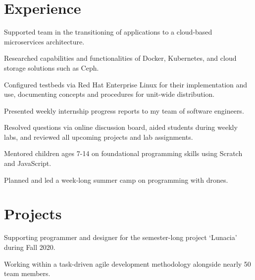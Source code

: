 \documentclass[]{deedy-resume-openfont}
\begin{document}
\section{Experience}


\begin{tightemize}
\item Supported team in the transitioning of applications to a cloud-based microservices architecture.
\item Researched capabilities and functionalities of Docker, Kubernetes, and cloud storage solutions such as Ceph.
\item Configured testbeds via Red Hat Enterprise Linux for their implementation and use, documenting concepts and procedures for unit-wide distribution.
\item Presented weekly internship progress reports to my team of software engineers.
\end{tightemize}
\sectionsep

\begin{tightemize}
\item Resolved questions via online discussion board, aided students during weekly labs, and reviewed all upcoming projects and lab assignments.
\end{tightemize}
\sectionsep

\begin{tightemize}
\item Mentored children ages 7-14 on foundational programming skills using Scratch and JavaScript.
\item Planned and led a week-long summer camp on programming with drones.
\end{tightemize}
\sectionsep

\section{Projects}
\begin{tightemize}
\item Supporting programmer and designer for the semester-long project `Lunacia' during Fall 2020.
\item Working within a task-driven agile development methodology alongside nearly 50 team members.
\end{tightemize}
\sectionsep
\end{document}
